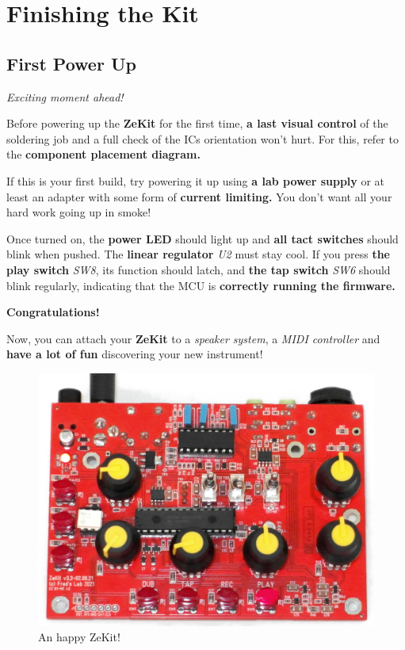 \documentclass{scrartcl}
\begin{document}
\pagebreak
\section{Finishing the Kit}

\subsection{First Power Up}
\Large
\emph{Exciting moment ahead!}
\normalsize

Before powering up the \textbf{ZeKit} for the first time, \textbf{a last visual control} of the soldering job and a full check of the ICs orientation won't hurt.
For this, refer to the \textbf{component placement diagram.}

If this is your first build, try powering it up using \textbf{a lab power supply} or at least an adapter with some form of \textbf{current limiting.}
You don't want all your hard work going up in smoke!

Once turned on, the \textbf{power LED} should light up and \textbf{all tact switches} should blink when pushed. The \textbf{linear regulator} \emph{U2} must stay cool.
If you press \textbf{the play switch} \emph{SW8}, its function should latch, and \textbf{the tap switch} \emph{SW6} should blink regularly, indicating that the MCU is \textbf{correctly running the firmware.}

\vspace{0.5cm}
\textbf{Congratulations!}

Now, you can attach your \textbf{ZeKit} to a \emph{speaker system}, a \emph{MIDI controller} and \textbf{have a lot of fun} discovering your new instrument!

\begin{figure}[!ht]
    \begin{center}
        \includegraphics[scale=0.28]{assets/zekit-happy.jpg}
        \caption{An happy ZeKit!}
    \end{center}
\end{figure}
\end{document}
